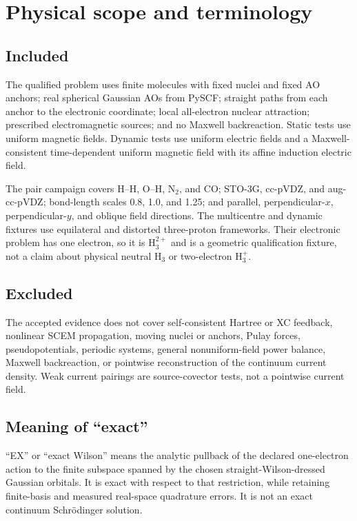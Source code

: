 \documentclass[11pt]{article}
\begin{document}
\section{Physical scope and terminology}

\subsection{Included}

The qualified problem uses finite molecules with fixed nuclei and fixed AO
anchors; real spherical Gaussian AOs from PySCF; straight paths from each
anchor to the electronic coordinate; local all-electron nuclear attraction;
prescribed electromagnetic sources; and no Maxwell backreaction.  Static
tests use uniform magnetic fields.  Dynamic tests use uniform electric fields
and a Maxwell-consistent time-dependent uniform magnetic field with its
affine induction electric field.

The pair campaign covers H--H, O--H, N$_2$, and CO; STO-3G, cc-pVDZ, and
aug-cc-pVDZ; bond-length scales 0.8, 1.0, and 1.25; and parallel,
perpendicular-$x$, perpendicular-$y$, and oblique field directions.  The
multicentre and dynamic fixtures use equilateral and distorted three-proton
frameworks.  Their electronic problem has one electron, so it is
$\mathrm{H}_3^{2+}$ and is a geometric qualification fixture, not a claim
about physical neutral H$_3$ or two-electron H$_3^+$.

\subsection{Excluded}

The accepted evidence does not cover self-consistent Hartree or XC feedback,
nonlinear SCEM propagation, moving nuclei or anchors, Pulay forces,
pseudopotentials, periodic systems, general nonuniform-field power balance,
Maxwell backreaction, or pointwise reconstruction of the continuum current
density.  Weak current pairings are source-covector tests, not a pointwise
current field.

\subsection{Meaning of ``exact''}

``EX'' or ``exact Wilson'' means the analytic pullback of the declared
one-electron action to the finite subspace spanned by the chosen
straight-Wilson-dressed Gaussian orbitals.  It is exact with respect to that
restriction, while retaining finite-basis and measured real-space quadrature
errors.  It is not an exact continuum Schr\"odinger solution.
\end{document}
